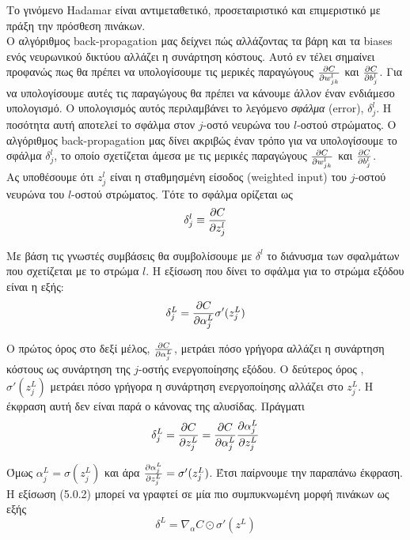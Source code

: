 \documentclass[11pt]{article} %
\numberwithin{equation}{subsection}
\begin{document}
Το γινόμενο Hadamar είναι αντιμεταθετικό, προσεταιριστικό και επιμεριστικό με πράξη την πρόσθεση πινάκων.\\

Ο αλγόριθμος back-propagation μας δείχνει πώς αλλάζοντας τα βάρη και τα biases ενός νευρωνικού δικτύου αλλάζει η συνάρτηση κόστους. Αυτό εν τέλει σημαίνει προφανώς πως θα πρέπει να υπολογίσουμε τις μερικές παραγώγους $\pdv{C}{w_{jk}^{l}}$ και $\pdv{C}{b_{j}^{l}}$. Για να υπολογίσουμε αυτές τις παραγώγους θα πρέπει να κάνουμε άλλον έναν ενδιάμεσο υπολογισμό. Ο υπολογισμός αυτός περιλαμβάνει το λεγόμενο \textit{σφάλμα} (error), $\delta_{j}^{l}$. Η ποσότητα αυτή αποτελεί το σφάλμα στον $j$-οστό νευρώνα του $l$-οστού στρώματος. Ο αλγόριθμος back-propagation μας δίνει ακριβώς έναν τρόπο για να υπολογίσουμε το σφάλμα $\delta_{j}^{l}$, το οποίο σχετίζεται άμεσα με τις μερικές παραγώγους $\pdv{C}{w_{jk}^{l}}$ και $\pdv{C}{b_{j}^{l}}$.\\

Ας υποθέσουμε ότι $z_{j}^{l}$ είναι η σταθμησμένη είσοδος (weighted input) του $j$-οστού νευρώνα του $l$-οστού στρώματος. Τότε το σφάλμα ορίζεται ως
\begin{align*}
\delta _{j}^{l} \equiv \pdv{C}{z_{j}^{l}}
\end{align*}

Με βάση τις γνωστές συμβάσεις θα συμβολίσουμε με $\delta^{l}$ το διάνυσμα των σφαλμάτων που σχετίζεται με το στρώμα $l$. Η εξίσωση που δίνει το σφάλμα για το στρώμα εξόδου είναι η εξής:
\begin{equation}
\delta _{j}^{L} = \pdv{C}{\alpha_{j}^{L}} \sigma'(z_{j}^{L})
\end{equation}

Ο πρώτος όρος στο δεξί μέλος, $\pdv{C}{\alpha_{j}^{L}}$, μετράει πόσο γρήγορα αλλάζει η συνάρτηση κόστους ως συνάρτηση της $j$-οστής ενεργοποίησης εξόδου. Ο δεύτερος όρος , $\sigma'(z_{j}^{L})$ μετράει πόσο γρήγορα η συνάρτηση ενεργοποίησης \sigma αλλάζει στο $z_{j}^{L}$. Η έκφραση αυτή δεν είναι παρά ο κάνονας της αλυσίδας. Πράγματι
\begin{align*}
\delta_{j}^{L} = \pdv{C}{z_{j}^{L}} = \pdv{C}{\alpha_{j}^{L}} \pdv{\alpha_{j}^{L}}{z_{j}^{L}}
\end{align*}

Όμως $\alpha_{j}^{L} = \sigma (z_{j}^{L})$ και άρα $\pdv{\alpha_{j}^{L}}{z_{j}^{L}} = \sigma'(z_{j}^{L})$. Έτσι παίρνουμε την παραπάνω έκφραση. Η εξίσωση (5.0.2) μπορεί να γραφτεί σε μία πιο συμπυκνωμένη μορφή πινάκων ως εξής
\begin{equation}
\delta^{L} = \nabla_{\alpha} C \odot \sigma' (z^{L})
\end{equation}
\end{document}
